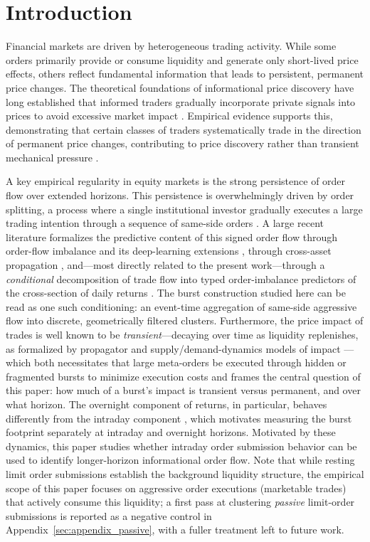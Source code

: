 \documentclass[11pt]{article}
\begin{document}
\section{Introduction}
Financial markets are driven by heterogeneous trading activity. While some orders primarily provide or consume liquidity and generate only short-lived price effects, others reflect fundamental information that leads to persistent, permanent price changes. The theoretical foundations of informational price discovery have long established that informed traders gradually incorporate private signals into prices to avoid excessive market impact \citep{kyle1985}. Empirical evidence supports this, demonstrating that certain classes of traders systematically trade in the direction of permanent price changes, contributing to price discovery rather than transient mechanical pressure \citep{brogaard2014, hasbrouck1991}.

A key empirical regularity in equity markets is the strong persistence of order flow over extended horizons. This persistence is overwhelmingly driven by order splitting, a process where a single institutional investor gradually executes a large trading intention through a sequence of same-side orders \citep{toth2015}. A large recent literature formalizes the predictive content of this signed order flow through order-flow imbalance and its deep-learning extensions \citep{cont2014,kolm2023,lucchese2024}, through cross-asset propagation \citep{cont2023crossimpact}, and---most directly related to the present work---through a \emph{conditional} decomposition of trade flow into typed order-imbalance predictors of the cross-section of daily returns \citep{cont2023clientflow,lrc2024,sitaru2023}. The burst construction studied here can be read as one such conditioning: an event-time aggregation of same-side aggressive flow into discrete, geometrically filtered clusters. Furthermore, the price impact of trades is well known to be \emph{transient}---decaying over time as liquidity replenishes, as formalized by propagator and supply/demand-dynamics models of impact \citep{bouchaud2004,obizhaeva2013}---which both necessitates that large meta-orders be executed through hidden or fragmented bursts to minimize execution costs \citep{moro2009, bucci2019} and frames the central question of this paper: how much of a burst's impact is transient versus permanent, and over what horizon. The overnight component of returns, in particular, behaves differently from the intraday component \citep{lou2019}, which motivates measuring the burst footprint separately at intraday and overnight horizons. Motivated by these dynamics, this paper studies whether intraday order submission behavior can be used to identify longer-horizon informational order flow. Note that while resting limit order submissions establish the background liquidity structure, the empirical scope of this paper focuses on aggressive order executions (marketable trades) that actively consume this liquidity; a first pass at clustering \emph{passive} limit-order submissions is reported as a negative control in Appendix~\ref{sec:appendix_passive}, with a fuller treatment left to future work.
\end{document}
